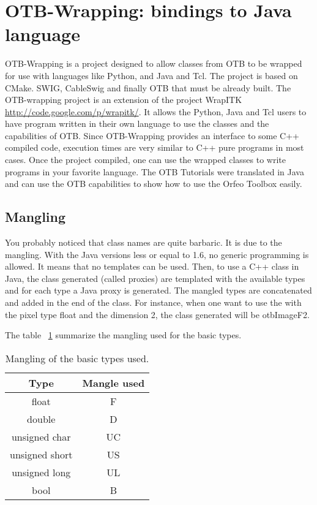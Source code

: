 \section{OTB-Wrapping: bindings to Java language}
OTB-Wrapping is a project designed to allow classes from OTB 
to be wrapped for use with languages like Python, and Java and Tcl. 
The project is based on CMake. SWIG, CableSwig and finally OTB that must be already built.
 The OTB-wrapping project is an extension of the project WrapITK \url{http://code.google.com/p/wrapitk/}. 
It allows the Python, Java and Tcl users to have program written in their own language to use the classes and 
the capabilities of OTB.
Since OTB-Wrapping provides an interface to some C++ compiled code, execution times are very similar to C++ 
pure programs in most cases.
Once the project compiled, one can use the wrapped classes to write programs in your favorite language.
The OTB Tutorials were translated in Java and can use the OTB capabilities to show how to use the 
Orfeo Toolbox easily. 

\subsection{Mangling}
You probably noticed that class names are quite barbaric. It is due to the
mangling. With the Java versions less or equal to 1.6, no generic programming is
allowed. It means that no templates can be used. Then, to use a C++  class in Java, the class generated 
(called proxies) are templated with the available types and for each type a Java
proxy is generated. The mangled types are concatenated and added in the end of
the class. For instance, when one want to use the  with the pixel type float 
and the dimension 2, the class generated will be otbImageF2.

The table ~\ref{tab:basictypetomangle} summarize the mangling used for the basic types. 

\begin{table}[!htbp]
\begin{center}
\begin{tabular}{|c|c|}
\hline
Type                  &  Mangle used  \\
\hline
float                 &  F         \\
double                &  D         \\
unsigned char         &  UC        \\
unsigned short        &  US        \\
unsigned long         &  UL        \\
bool                  &  B         \\

\hline 
\end{tabular}
\caption{Mangling of the basic types used.}\label{tab:basictypetomangle}
\end{center}
\end{table}

